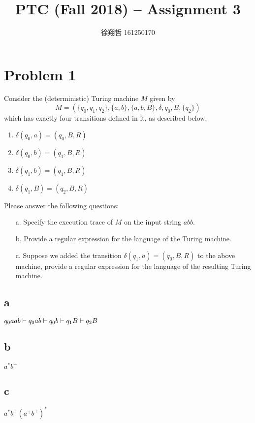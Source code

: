 \documentclass[a4paper,UTF8]{ctexart}
\theoremstyle{definition}
\begin{document}
\title{PTC (Fall 2018) -- Assignment 3}
\author{徐翔哲 161250170}
\maketitle
\newpage

\section*{Problem 1}
Consider the (deterministic) Turing machine $M$ given by 
\[
M = (\{q_0, q_1, q_2\}, \{a, b\}, \{a, b, B\}, \delta, q_0, B, \{q_2\})
\]
which has exactly four transitions defined in it, as described below.
\begin{enumerate}
  \item $\delta(q_0, a) = (q_0, B, R)$
  \item $\delta(q_0, b) = (q_1, B, R)$
  \item $\delta(q_1, b) = (q_1, B, R)$
  \item $\delta(q_1, B) = (q_2, B, R)$
\end{enumerate}
Please answer the following questions:
\begin{enumerate}
  \item[a.]  Specify the execution trace of $M$ on the input string $abb$.
  \item[b.] Provide a regular expression for the language of the Turing machine.
  \item[c.]  Suppose we added the transition $\delta(q_1 ,a) = (q_0, B, R)$ to the above machine, provide a regular expression for the language of the resulting Turing machine.
\end{enumerate}

\subsection*{a}

$q_0aab \vdash q_0ab \vdash q_0b \vdash q_1B \vdash q_2B $

\subsection*{b}

$a^*b^+$

\subsection*{c}

$a^*b^+(a^+b^+)^*$
\end{document}
